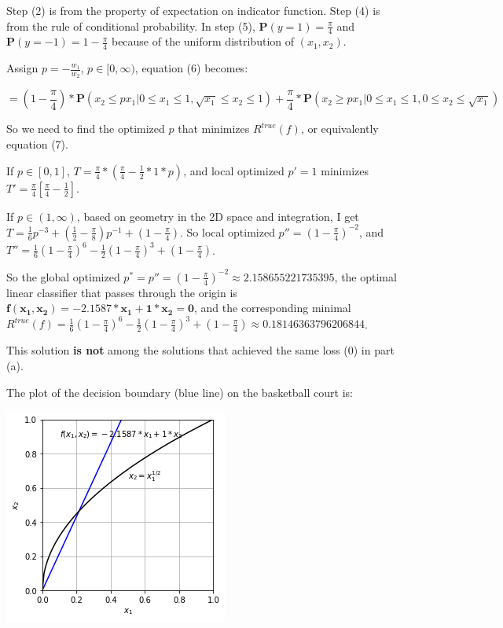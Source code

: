 \documentclass[paper=letter, fontsize=12pt]{article}
\begin{document}
\begin{enumerate}[label=(\alph*)]
	Step (2) is from the property of expectation on indicator function. Step (4) is from the rule of conditional probability. In step (5), $\mathbf{P}(y = 1) = \frac{\pi}{4}$ and $\mathbf{P}(y = -1) = 1- \frac{\pi}{4}$ because of the uniform distribution of $(x_1, x_2)$.
	
	Assign $p = -\frac{w_1}{w_2}$, $p \in [0, \infty)$, equation (6) becomes:
	
	\begin{equation}
	= (1 - \frac{\pi}{4}) * \mathbf{P}(x_2 \leq p x_1 | 0 \leq x_1 \leq 1, \sqrt{x_1} \leq x_2 \leq 1)
	+ \frac{\pi}{4} * \mathbf{P}(x_2 \geq p x_1 | 0 \leq x_1 \leq 1, 0 \leq x_2 \leq \sqrt{x_1}) 
	\end{equation}
	
	So we need to find the optimized $p$ that minimizes $R^{true}(f)$, or equivalently equation (7).
	
	If $p \in [0, 1]$, $T = \frac{\pi}{4} * (\frac{\pi}{4} - \frac{1}{2} * 1 * p)$, and local optimized $p' = 1$ minimizes $T' = \frac{\pi}{4}[\frac{\pi}{4} - \frac{1}{2}]$.
	
	If $p \in (1, \infty)$, based on geometry in the 2D space and integration, I get $T = \frac{1}{6} p^{-3} + (\frac{1}{2} - \frac{\pi}{8}) p^{-1} + (1 - \frac{\pi}{4})$. So local optimized $p'' = (1 - \frac{\pi}{4}) ^ {-2}$, and $T'' = \frac{1}{6}(1-\frac{\pi}{4})^6 - \frac{1}{2}(1-\frac{\pi}{4})^3 + (1-\frac{\pi}{4})$.
	
	So the global optimized $p^* = p'' = (1 - \frac{\pi}{4}) ^ {-2} \approx \mathbf{2.158655221735395}$, the optimal linear classifier that passes through the origin is $\mathbf{f(x_1, x_2) = -2.1587 * x_1 + 1 * x_2 = 0}$, and the corresponding minimal $R^{true}(f) = \frac{1}{6}(1-\frac{\pi}{4})^6 - \frac{1}{2}(1-\frac{\pi}{4})^3 + (1-\frac{\pi}{4}) \approx \mathbf{0.18146363796206844}$.
	
	This solution \textbf{is not} among the solutions that achieved the same loss (0) in part (a).
	
	The plot of the decision boundary (blue line) on the basketball court is:
	
	\includegraphics[scale=0.6]{q1c.png}
	

\end{enumerate}
\end{document}
